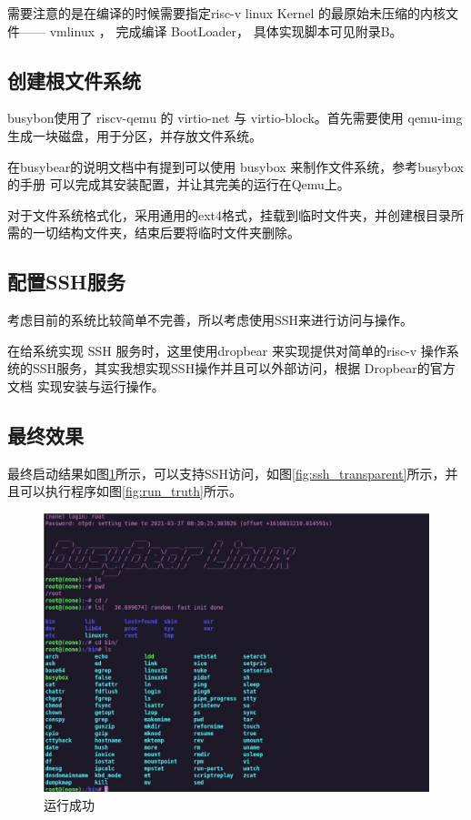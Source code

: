 需要注意的是在编译的时候需要指定risc-v linux Kernel 的最原始未压缩的内核文件—— vmlinux ， 完成编译 BootLoader， 具体实现脚本可见附录B。

\subsection{创建根文件系统}
busybon使用了 riscv-qemu 的 virtio-net 与 virtio-block。首先需要使用 qemu-img 生成一块磁盘，用于分区，并存放文件系统。

在busybear的说明文档中有提到可以使用 busybox  来制作文件系统，参考busybox的手册 \cite{busybox} 可以完成其安装配置，并让其完美的运行在Qemu上。

对于文件系统格式化，采用通用的ext4格式，挂载到临时文件夹，并创建根目录所需的一切结构文件夹，结束后要将临时文件夹删除。

\subsection{配置SSH服务}
考虑目前的系统比较简单不完善，所以考虑使用SSH来进行访问与操作。

在给系统实现 SSH 服务时，这里使用dropbear 来实现提供对简单的risc-v 操作系统的SSH服务，其实我想实现SSH操作并且可以外部访问，根据 Dropbear的官方文档\cite{Dropbear} 实现安装与运行操作。

\subsection{最终效果}
最终启动结果如图\ref{fig:success}所示，可以支持SSH访问，如图\ref{fig:ssh_transparent}所示，并且可以执行程序如图\ref{fig:run_truth}所示。
\begin{figure}[htbp]
  \centering %
  \includegraphics[width=0.9 \textwidth]{figs/Process/success.png}
  \caption{运行成功}
  \label{fig:success} %
\end{figure}

